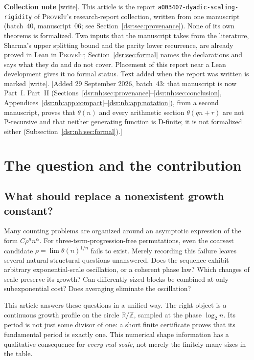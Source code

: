 \documentclass[11pt,a4paper]{article}
\numberwithin{equation}{section}
\theoremstyle{definition}
\theoremstyle{remark}
\newcommand{\R}{\mathbb R}
\newcommand{\Z}{\mathbb Z}
\newcommand{\repo}{\textsc{ProveIt}}
\newcommand{\wtag}{\textup{[write]}}
\newcommand{\lean}[1]{\nolinkurl{#1}}
\theoremstyle{definition}
\theoremstyle{plain}
\begin{document}
\medskip
\noindent\textbf{Collection note} \wtag. This article is the report
\lean{a003407-dyadic-scaling-rigidity} of \repo's research-report collection,
written from one manuscript (batch~40, manuscript~06; see
Section~\ref{dsr:sec:provenance}). None of its own theorems is formalized.
Two inputs that the manuscript takes from the literature, Sharma's upper
splitting bound and the parity lower recurrence, are already proved in Lean
in \repo; Section~\ref{dsr:sec:formal} names the declarations and says what
they do and do not cover. Placement of this report near a Lean development
gives it no formal status. Text added when the report was written is marked
\wtag.
[Added 29 September 2026, batch~43: that manuscript is now Part~I.
Part~II (Sections~\ref{dsr:nh:sec:provenance}--\ref{dsr:nh:sec:conclusion},
Appendices~\ref{dsr:nh:app:compact}--\ref{dsr:nh:app:notation}), from a
second manuscript, proves that $\theta(n)$ and every arithmetic section
$\theta(qn+r)$ are not P-recursive and that neither generating function is
D-finite; it is not formalized either
(Subsection~\ref{dsr:nh:sec:formal}).]
\newpage
\tableofcontents
\newpage
{}

\section{The question and the contribution}
\label{dsr:sec:intro}

\subsection{What should replace a nonexistent growth constant?}
Many counting problems are organized around an asymptotic expression of the
form $C\rho^n n^\alpha$. For three-term-progression-free permutations, even the
coarsest candidate $\rho=\lim\theta(n)^{1/n}$ fails to exist. Merely recording
this failure leaves several natural structural questions unanswered. Does the
sequence exhibit arbitrary exponential-scale oscillation, or a coherent
phase law? Which changes of scale preserve its growth? Can differently sized
blocks be combined at only subexponential cost? Does averaging eliminate the
oscillation?

This article answers these questions in a unified way. The right object is a
continuous growth profile on the circle $\R/\Z$, sampled at the phase
$\log_2 n$. Its period is not just some divisor of one: a short finite
certificate proves that its fundamental period is exactly one. This numerical
shape information has a qualitative consequence for \emph{every real scale},
not merely the finitely many sizes in the table.
\end{document}
